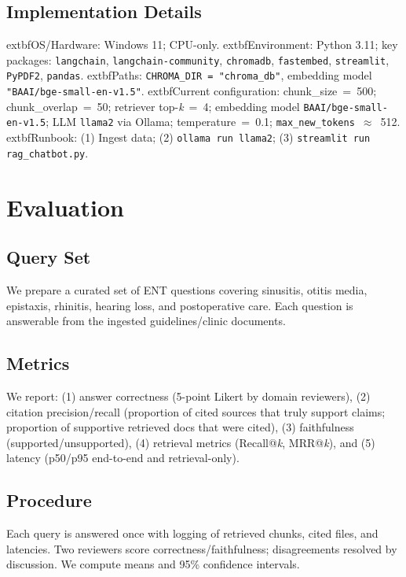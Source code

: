 \documentclass[conference]{IEEEtran}
\begin{document}
\subsection{Implementation Details}
	extbf{OS/Hardware:} Windows 11; CPU-only.\newline
	extbf{Environment:} Python 3.11; key packages: \texttt{langchain}, \texttt{langchain-community}, \texttt{chromadb}, \texttt{fastembed}, \texttt{streamlit}, \texttt{PyPDF2}, \texttt{pandas}.\newline
	extbf{Paths:} \texttt{CHROMA\_DIR = "chroma\_db"}, embedding model \texttt{"BAAI/bge-small-en-v1.5"}.\newline
	extbf{Current configuration:} chunk\_size~=~500; chunk\_overlap~=~50; retriever top-\emph{k}~=~4; embedding model \texttt{BAAI/bge-small-en-v1.5}; LLM \texttt{llama2} via Ollama; temperature~=~0.1; \texttt{max\_new\_tokens}~$\approx$~512.\newline
	extbf{Runbook:} (1) Ingest data; (2) \texttt{ollama run llama2}; (3) \texttt{streamlit run rag\_chatbot.py}.

\section{Evaluation}
\subsection{Query Set}
We prepare a curated set of ENT questions covering sinusitis, otitis media, epistaxis, rhinitis, hearing loss, and postoperative care. Each question is answerable from the ingested guidelines/clinic documents.

\subsection{Metrics}
We report: (1) answer correctness (5-point Likert by domain reviewers), (2) citation precision/recall (proportion of cited sources that truly support claims; proportion of supportive retrieved docs that were cited), (3) faithfulness (supported/unsupported), (4) retrieval metrics (Recall@\emph{k}, MRR@\emph{k}), and (5) latency (p50/p95 end-to-end and retrieval-only).

\subsection{Procedure}
Each query is answered once with logging of retrieved chunks, cited files, and latencies. Two reviewers score correctness/faithfulness; disagreements resolved by discussion. We compute means and 95\% confidence intervals.
\end{document}
